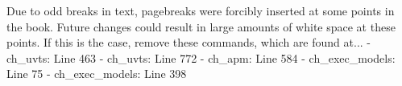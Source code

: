 Due to odd breaks in text, pagebreaks were forcibly inserted at some points in the book. Future changes could result in large amounts of white space at these points. If this is the case, remove these commands, which are found at...
- ch_uvts: Line 463
- ch_uvts: Line 772
- ch_apm: Line 584
- ch_exec_models: Line 75
- ch_exec_models: Line 398